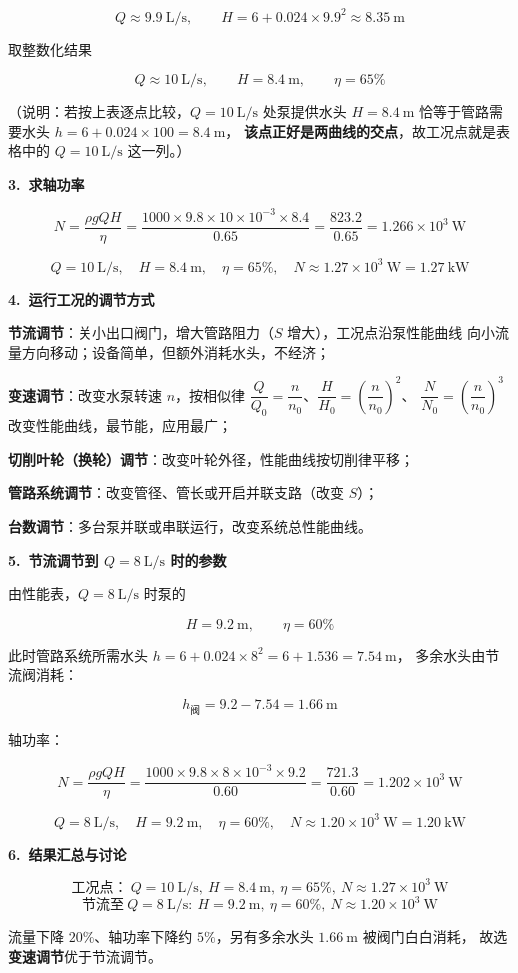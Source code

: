 \begin{jie}
\[ Q\approx9.9\ \mathrm{L/s},\qquad H=6+0.024\times9.9^2\approx8.35\ \mathrm{m} \]

取整数化结果

\[ Q\approx10\ \mathrm{L/s},\qquad H=8.4\ \mathrm{m},\qquad \eta=65\% \]

（说明：若按上表逐点比较，$Q=10\ \mathrm{L/s}$ 处泵提供水头 $H=8.4\ \mathrm{m}$
恰等于管路需要水头 $h=6+0.024\times100=8.4\ \mathrm{m}$，
\textbf{该点正好是两曲线的交点}，故工况点就是表格中的 $Q=10\ \mathrm{L/s}$ 这一列。）

\textbf{3.\ 求轴功率}

\[ N=\frac{\rho g QH}{\eta}
=\frac{1000\times9.8\times10\times10^{-3}\times8.4}{0.65}
=\frac{823.2}{0.65}=1.266\times10^{3}\ \mathrm{W} \]

\[ Q=10\ \mathrm{L/s},\quad H=8.4\ \mathrm{m},\quad \eta=65\%,\quad
N\approx1.27\times10^{3}\ \mathrm{W}=1.27\ \mathrm{kW} \]

\textbf{4.\ 运行工况的调节方式}

\begin{xiaowen}
\item \textbf{节流调节}：关小出口阀门，增大管路阻力（$S$ 增大），工况点沿泵性能曲线
向小流量方向移动；设备简单，但额外消耗水头，不经济；
\item \textbf{变速调节}：改变水泵转速 $n$，按相似律
$\dfrac{Q}{Q_0}=\dfrac{n}{n_0}$、$\dfrac{H}{H_0}=\left(\dfrac{n}{n_0}\right)^2$、
$\dfrac{N}{N_0}=\left(\dfrac{n}{n_0}\right)^3$ 改变性能曲线，最节能，应用最广；
\item \textbf{切削叶轮（换轮）调节}：改变叶轮外径，性能曲线按切削律平移；
\item \textbf{管路系统调节}：改变管径、管长或开启并联支路（改变 $S$）；
\item \textbf{台数调节}：多台泵并联或串联运行，改变系统总性能曲线。
\end{xiaowen}

\textbf{5.\ 节流调节到 $Q=8\ \mathrm{L/s}$ 时的参数}

由性能表，$Q=8\ \mathrm{L/s}$ 时泵的

\[ H=9.2\ \mathrm{m},\qquad \eta=60\% \]

此时管路系统所需水头 $h=6+0.024\times8^2=6+1.536=7.54\ \mathrm{m}$，
多余水头由节流阀消耗：

\[ h_{\text{阀}}=9.2-7.54=1.66\ \mathrm{m} \]

轴功率：

\[ N=\frac{\rho gQH}{\eta}
=\frac{1000\times9.8\times8\times10^{-3}\times9.2}{0.60}
=\frac{721.3}{0.60}=1.202\times10^{3}\ \mathrm{W} \]

\[ Q=8\ \mathrm{L/s},\quad H=9.2\ \mathrm{m},\quad \eta=60\%,\quad
N\approx1.20\times10^{3}\ \mathrm{W}=1.20\ \mathrm{kW} \]

\textbf{6.\ 结果汇总与讨论}

\[ \text{工况点：}\ Q=10\ \mathrm{L/s},\ H=8.4\ \mathrm{m},\ \eta=65\%,\
N\approx1.27\times10^{3}\ \mathrm{W} \]
\[ \text{节流至}\ Q=8\ \mathrm{L/s}:\ H=9.2\ \mathrm{m},\ \eta=60\%,\
N\approx1.20\times10^{3}\ \mathrm{W} \]

流量下降 $20\%$、轴功率下降约 $5\%$，另有多余水头 $1.66\ \mathrm{m}$ 被阀门白白消耗，
故选 \textbf{变速调节}优于节流调节。
\end{jie}
